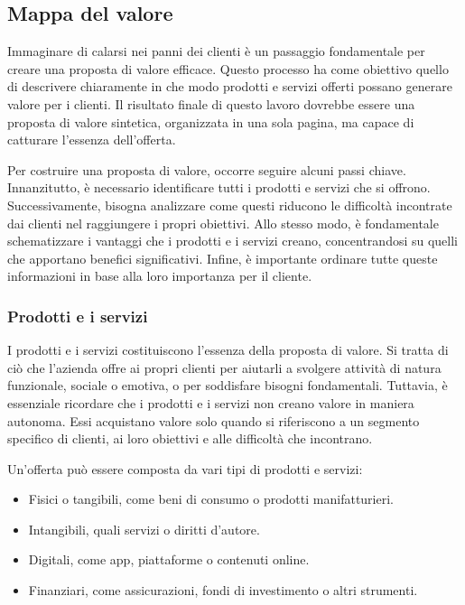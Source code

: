 \subsection{Mappa del valore}
Immaginare di calarsi nei panni dei clienti è un passaggio fondamentale per creare una proposta di valore efficace. Questo processo ha come obiettivo quello di descrivere chiaramente in che modo prodotti e servizi offerti possano generare valore per i clienti. Il risultato finale di questo lavoro dovrebbe essere una proposta di valore sintetica, organizzata in una sola pagina, ma capace di catturare l'essenza dell'offerta.

Per costruire una proposta di valore, occorre seguire alcuni passi chiave. Innanzitutto, è necessario identificare tutti i prodotti e servizi che si offrono. Successivamente, bisogna analizzare come questi riducono le difficoltà incontrate dai clienti nel raggiungere i propri obiettivi. Allo stesso modo, è fondamentale schematizzare i vantaggi che i prodotti e i servizi creano, concentrandosi su quelli che apportano benefici significativi. Infine, è importante ordinare tutte queste informazioni in base alla loro importanza per il cliente.

\subsubsection{Prodotti e i servizi}
I prodotti e i servizi costituiscono l'essenza della proposta di valore. Si tratta di ciò che l’azienda offre ai propri clienti per aiutarli a svolgere attività di natura funzionale, sociale o emotiva, o per soddisfare bisogni fondamentali. Tuttavia, è essenziale ricordare che i prodotti e i servizi non creano valore in maniera autonoma. Essi acquistano valore solo quando si riferiscono a un segmento specifico di clienti, ai loro obiettivi e alle difficoltà che incontrano.

Un’offerta può essere composta da vari tipi di prodotti e servizi:
\begin{itemize}
    \item Fisici o tangibili, come beni di consumo o prodotti manifatturieri.
    \item Intangibili, quali servizi o diritti d’autore.
    \item Digitali, come app, piattaforme o contenuti online.
    \item Finanziari, come assicurazioni, fondi di investimento o altri strumenti.
\end{itemize}


